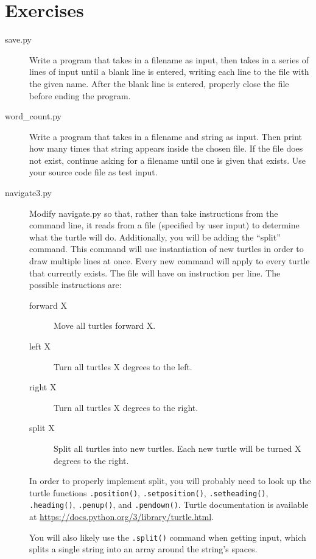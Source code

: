 \documentclass[11pt]{cselabheader}
\begin{document}
\section{Exercises}
\label{sec:ex}

\begin{description}
\item[save.py] Write a program that takes in a filename as input, then takes in a series of lines of input until a blank line is entered, writing each line to the file with the given name. After the blank line is entered, properly close the file before ending the program.
\item[word\_count.py] Write a program that takes in a filename and string as input. Then print how many times that string appears inside the chosen file. If the file does not exist, continue asking for a filename until one is given that exists. Use your source code file as test input.
\item[navigate3.py] Modify navigate.py so that, rather than take instructions from the command line, it reads from a file (specified by user input) to determine what the turtle will do. Additionally, you will be adding the ``split'' command. This command will use instantiation of new turtles in order to draw multiple lines at once. Every new command will apply to every turtle that currently exists. The file will have on instruction per line. The possible instructions are:

  \begin{description}
    \item[forward X] Move all turtles forward X.
    \item[left X] Turn all turtles X degrees to the left.
    \item[right X] Turn all turtles X degrees to the right.
    \item[split X] Split all turtles into new turtles. Each new turtle will be turned X degrees to the right.
  \end{description}

  In order to properly implement split, you will probably need to look up the turtle functions \lstinline{.position()}, \lstinline{.setposition()}, \lstinline{.setheading()}, \lstinline{.heading()}, \lstinline{.penup()}, and \lstinline{.pendown()}. Turtle documentation is available at \url{https://docs.python.org/3/library/turtle.html}.

  You will also likely use the \lstinline{.split()} command when getting input, which splits a single string into an array around the string's spaces.


\end{description}
\end{document}
